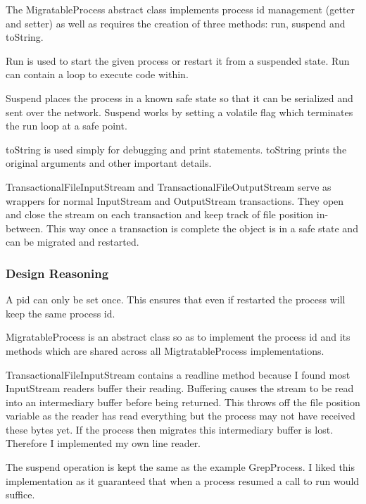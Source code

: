 \documentclass[12pt]{article}
\begin{document}
The MigratableProcess abstract class implements process id management (getter and setter) as well as requires the creation of three methods: run, suspend and toString.

Run is used to start the given process or restart it from a suspended state. Run can contain a loop to execute code within.

Suspend places the process in a known safe state so that it can be serialized and sent over the network. Suspend works by setting a volatile flag which terminates the run loop at a safe point.

toString is used simply for debugging and print statements. toString prints the original arguments and other important details.

TransactionalFileInputStream and TransactionalFileOutputStream serve as wrappers for normal InputStream and OutputStream transactions. They open and close the stream on each transaction and keep track of file position in-between. This way once a transaction is complete the object is in a safe state and can be migrated and restarted.

\subsubsection{Design Reasoning}
A pid can only be set once. This ensures that even if restarted the process will keep the same process id.

MigratableProcess is an abstract class so as to implement the process id and its methods which are shared across all MigtratableProcess implementations.

TransactionalFileInputStream contains a readline method because I found most InputStream readers buffer their reading. Buffering causes the stream to be read into an intermediary buffer before being returned. This throws off the file position variable as the reader has read everything but the process may not have received these bytes yet. If the process then migrates this intermediary buffer is lost. Therefore I implemented my own line reader.

The suspend operation is kept the same as the example GrepProcess. I liked this implementation as it guaranteed that when a process resumed a call to run would suffice.
\end{document}
